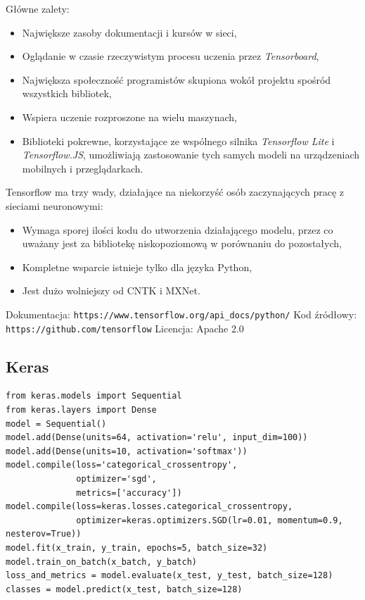 \documentclass[12pt,a4paper,twoside,titlepage,openright]{book}
\begin{document}
\begin{itemize}
\begin{itemize}
Główne zalety:
\begin{itemize}
\item Największe zasoby dokumentacji i kursów w sieci,
\item Oglądanie w czasie rzeczywistym procesu uczenia przez \textit{Tensorboard},
\item Największa społeczność programistów skupiona wokół projektu spośród wszystkich bibliotek,
\item Wspiera uczenie rozproszone na wielu maszynach,
\item Biblioteki pokrewne, korzystające ze wspólnego silnika \textit{Tensorflow Lite} i \textit{Tensorflow.JS}, umożliwiają zastosowanie tych samych modeli na urządzeniach mobilnych i przeglądarkach.
\end{itemize}

Tensorflow ma trzy wady, działające na niekorzyść osób zaczynających pracę z sieciami neuronowymi:
\begin{itemize}
\item Wymaga sporej ilości kodu do utworzenia działającego modelu, przez co uważany jest za bibliotekę niskopoziomową w porównaniu do pozostałych,
\item Kompletne wsparcie istnieje tylko dla języka Python, 
\item Jest dużo wolniejszy od CNTK i MXNet.\cite{DBLP:journals/corr/ShiWXC16}
\end{itemize}

\noindent
\newline 
Dokumentacja: \texttt{https://www.tensorflow.org/api\_docs/python/}
\newline 
Kod źródłowy: \texttt{https://github.com/tensorflow}
\newline 
Licencja: Apache 2.0

\subsection{Keras}


\noindent
\begin{minipage}{\linewidth}
\begin{lstlisting}[caption=Skrypt najprostszego modelu sekwencyjnego (Keras w 30 sekund), label=lst:test]
from keras.models import Sequential
from keras.layers import Dense
model = Sequential()
model.add(Dense(units=64, activation='relu', input_dim=100))
model.add(Dense(units=10, activation='softmax'))
model.compile(loss='categorical_crossentropy',
              optimizer='sgd',
              metrics=['accuracy'])
model.compile(loss=keras.losses.categorical_crossentropy,
              optimizer=keras.optimizers.SGD(lr=0.01, momentum=0.9, nesterov=True))
model.fit(x_train, y_train, epochs=5, batch_size=32)
model.train_on_batch(x_batch, y_batch)
loss_and_metrics = model.evaluate(x_test, y_test, batch_size=128)
classes = model.predict(x_test, batch_size=128)
\end{lstlisting}
\end{minipage}


\end{itemize}
\end{itemize}
\end{document}
